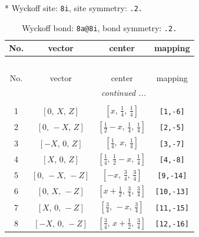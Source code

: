\documentclass[fleqn,8pt]{jsarticle}
\begin{document}
* Wyckoff site: {\tt 8i}, site symmetry: {\tt .2.}
\renewcommand{\arraystretch}{1.2}
\begin{longtable}{cccc}
\caption{Wyckoff bond: {\tt 8a@8i}, bond symmetry: {\tt .2.}}
 \\
 \hline \hline
No. & vector & center & mapping \\ \hline \endfirsthead

\multicolumn{3}{l}{\tablename\ \thetable{}} \\
 \hline \hline
No. & vector & center & mapping \\ \hline \endhead

 \hline \hline
\multicolumn{3}{r}{\footnotesize\it continued ...} \\ \endfoot

 \hline \hline
\multicolumn{3}{r}{} \\ \endlastfoot

1 & $\left[ 0,\, X,\, Z \right]$ & $\left[ x,\, \frac{1}{4},\, \frac{1}{4} \right]$ & {\tt [1,-6]} \\ \hline
2 & $\left[ 0,\, - X,\, Z \right]$ & $\left[ \frac{1}{2} - x,\, \frac{1}{4},\, \frac{1}{4} \right]$ & {\tt [2,-5]} \\ \hline
3 & $\left[ - X,\, 0,\, Z \right]$ & $\left[ \frac{1}{4},\, x,\, \frac{1}{4} \right]$ & {\tt [3,-7]} \\ \hline
4 & $\left[ X,\, 0,\, Z \right]$ & $\left[ \frac{1}{4},\, \frac{1}{2} - x,\, \frac{1}{4} \right]$ & {\tt [4,-8]} \\ \hline
5 & $\left[ 0,\, - X,\, - Z \right]$ & $\left[ - x,\, \frac{3}{4},\, \frac{3}{4} \right]$ & {\tt [9,-14]} \\ \hline
6 & $\left[ 0,\, X,\, - Z \right]$ & $\left[ x + \frac{1}{2},\, \frac{3}{4},\, \frac{3}{4} \right]$ & {\tt [10,-13]} \\ \hline
7 & $\left[ X,\, 0,\, - Z \right]$ & $\left[ \frac{3}{4},\, - x,\, \frac{3}{4} \right]$ & {\tt [11,-15]} \\ \hline
8 & $\left[ - X,\, 0,\, - Z \right]$ & $\left[ \frac{3}{4},\, x + \frac{1}{2},\, \frac{3}{4} \right]$ & {\tt [12,-16]} \\
\end{longtable}
\renewcommand{\arraystretch}{1.2}
\end{document}

